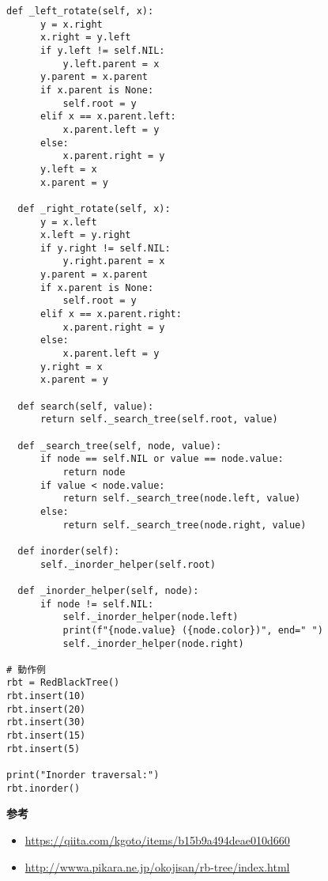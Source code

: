 \begin{lstlisting}[caption=赤黒木の実装, label=redblacktree, frame=TRBL, label={redblacktree}]
  def _left_rotate(self, x):
      y = x.right
      x.right = y.left
      if y.left != self.NIL:
          y.left.parent = x
      y.parent = x.parent
      if x.parent is None:
          self.root = y
      elif x == x.parent.left:
          x.parent.left = y
      else:
          x.parent.right = y
      y.left = x
      x.parent = y

  def _right_rotate(self, x):
      y = x.left
      x.left = y.right
      if y.right != self.NIL:
          y.right.parent = x
      y.parent = x.parent
      if x.parent is None:
          self.root = y
      elif x == x.parent.right:
          x.parent.right = y
      else:
          x.parent.left = y
      y.right = x
      x.parent = y

  def search(self, value):
      return self._search_tree(self.root, value)

  def _search_tree(self, node, value):
      if node == self.NIL or value == node.value:
          return node
      if value < node.value:
          return self._search_tree(node.left, value)
      else:
          return self._search_tree(node.right, value)

  def inorder(self):
      self._inorder_helper(self.root)

  def _inorder_helper(self, node):
      if node != self.NIL:
          self._inorder_helper(node.left)
          print(f"{node.value} ({node.color})", end=" ")
          self._inorder_helper(node.right)

# 動作例
rbt = RedBlackTree()
rbt.insert(10)
rbt.insert(20)
rbt.insert(30)
rbt.insert(15)
rbt.insert(5)

print("Inorder traversal:")
rbt.inorder()
\end{lstlisting}

\textbf{参考}
\begin{itemize}
  \item \url{https://qiita.com/kgoto/items/b15b9a494deae010d660}
  \item \url{http://wwwa.pikara.ne.jp/okojisan/rb-tree/index.html}
\end{itemize}